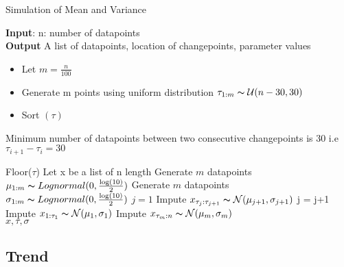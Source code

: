 \documentclass{article}
\newcommand\tab[1][0.4cm]{\hspace*{#1}}
\begin{document}
\begin{algorithm}
\caption{Simulation of Mean and Variance}\label{alg:cap}
\textbf{Input}: n: number of datapoints\\
\textbf{Output} A list of datapoints, location of changepoints, parameter values
\begin{algorithmic}
\begin{itemize}
    \item  Let $ m = \frac{n}{100}$
    \item  Generate m points using uniform distribution $\tau_{1:m} \thicksim \mathcal{U} (n-30,30)$ 
    \item  Sort $(\tau)$
\end{itemize}
     \Ensure Minimum number of datapoints between two consecutive changepoints \tab \tab \tab \tab \quad is 30 i.e $\tau_{i+1} - \tau_{i} = 30$ 

\State Floor($\tau$)
\State Let x be a list of n length
\State Generate $m$ datapoints $\mu_{1:m} \thicksim Lognormal(0,\frac{\log(10)}{2})$
\State Generate $m$ datapoints $\sigma_{1:m} \thicksim Lognormal(0,\frac{\log(10)}{2})$
\State $j = 1$
    \State Impute  $x_{\tau_{j} : \tau_{j+1}} \thicksim \mathcal{N}(\mu_{j+1},\sigma_{j+1})$
    \State j = j+1
\EndWhile
\State Impute $x_{1:\tau_{1}} \thicksim \mathcal{N}(\mu_{1},\sigma_{1})$
\State Impute $x_{\tau_{m}:n} \thicksim \mathcal{N}(\mu_{m},\sigma_{m})$ \\
\Return $x,\tau,\sigma$
\end{algorithmic}
\end{algorithm}

\subsection{Trend}
\end{document}
